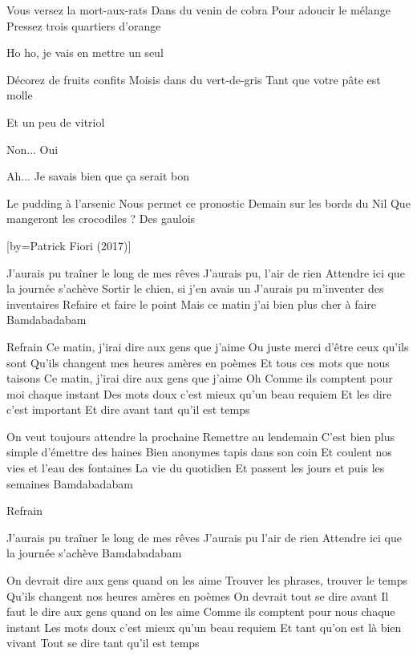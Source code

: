 \beginverse
Vous versez la mort-aux-rats
Dans du venin de cobra
Pour adoucir le mélange
Pressez trois quartiers d'orange
\endverse

\beginverse
Ho ho, je vais en mettre un seul
\endverse

\beginverse
Décorez de fruits confits
Moisis dans du vert-de-gris
Tant que votre pâte est molle
\endverse

\beginverse
Et un peu de vitriol \!
\endverse

\beginverse
Non... Oui \!
\endverse

\beginverse
Ah... Je savais bien que ça serait bon
\endverse

\beginverse
Le pudding à l'arsenic
Nous permet ce pronostic
Demain sur les bords du Nil
Que mangeront les crocodiles ?
Des gaulois \!
\endverse

[by={Patrick Fiori (2017)}]

\beginverse
J'aurais pu traîner le long de mes rêves
J'aurais pu, l'air de rien
Attendre ici que la journée s'achève
Sortir le chien, si j'en avais un
J'aurais pu m'inventer des inventaires
Refaire et faire le point
Mais ce matin j'ai bien plus cher à faire
Bamdabadabam
\endverse

\beginverse
Refrain
Ce matin, j'irai dire aux gens que j'aime
Ou juste merci d'être ceux qu'ils sont
Qu'ils changent mes heures amères en poèmes
Et tous ces mots que nous taisons
Ce matin, j'irai dire aux gens que j'aime
Oh\! Comme ils comptent pour moi chaque instant
Des mots doux c'est mieux qu'un beau requiem
Et les dire c'est important
Et dire avant tant qu'il est temps
\endverse

\beginverse
On veut toujours attendre la prochaine
Remettre au lendemain
C'est bien plus simple d'émettre des haines
Bien anonymes tapis dans son coin
Et coulent nos vies et l'eau des fontaines
La vie du quotidien
Et passent les jours et puis les semaines
Bamdabadabam
\endverse

\beginverse
Refrain
\endverse

\beginverse
J'aurais pu traîner le long de mes rêves
J'aurais pu l'air de rien
Attendre ici que la journée s'achève
Bamdabadabam
\endverse

\beginverse
On devrait dire aux gens quand on les aime
Trouver les phrases, trouver le temps
Qu'ils changent nos heures amères en poèmes
On devrait tout se dire avant
Il faut le dire aux gens quand on les aime
Comme ils comptent pour nous chaque instant
Les mots doux c'est mieux qu'un beau requiem
Et tant qu'on est là bien vivant
Tout se dire tant qu'il est temps
\endverse


